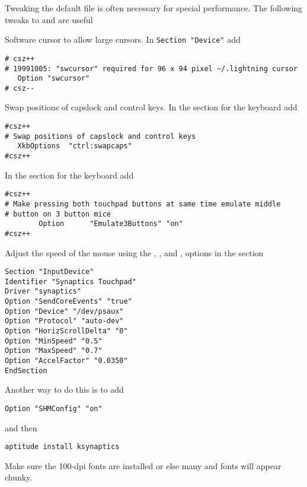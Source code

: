 \documentclass[12pt,twoside]{article}
\begin{document}
Tweaking the default  file is often necessary for
special performance.
The following tweaks to  and  are
useful 
\begin{enumerate*}
\item Software cursor to allow large cursors.
In \verb'Section "Device"' add
\begin{verbatim}
# csz++
# 19991005: "swcursor" required for 96 x 94 pixel ~/.lightning cursor
   Option "swcursor"
# csz--
\end{verbatim}
\item Swap positions of capslock and control keys.
In the  section for the keyboard add
\begin{verbatim}
#csz++
# Swap positions of capslock and control keys
   XkbOptions  "ctrl:swapcaps"
#csz++
\end{verbatim}
In the  section for the keyboard add
\begin{verbatim}
#csz++
# Make pressing both touchpad buttons at same time emulate middle
# button on 3 button mice
        Option      "Emulate3Buttons" "on"
#csz++
\end{verbatim}
Adjust the speed of the  mouse using the 
, , and ,
options in the  section
\begin{verbatim}
Section "InputDevice"
Identifier "Synaptics Touchpad"
Driver "synaptics"
Option "SendCoreEvents" "true"
Option "Device" "/dev/psaux"
Option "Protocol" "auto-dev"
Option "HorizScrollDelta" "0"
Option "MinSpeed" "0.5"
Option "MaxSpeed" "0.7"
Option "AccelFactor" "0.0350"
EndSection
\end{verbatim}
Another way to do this is to add 
\begin{verbatim}
Option "SHMConfig" "on"
\end{verbatim}
and then 
\begin{verbatim}
aptitude install ksynaptics
\end{verbatim}
\end{enumerate*}

Make sure the 100-dpi fonts are installed or else many 
and  fonts will appear chunky. 
\end{document}
